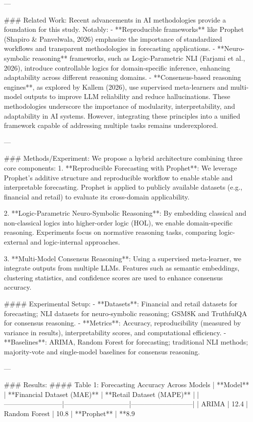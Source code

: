 ---

### Related Work:
Recent advancements in AI methodologies provide a foundation for this study. Notably:
- **Reproducible frameworks** like Prophet (Shapiro & Panvelwala, 2026) emphasize the importance of standardized workflows and transparent methodologies in forecasting applications.
- **Neuro-symbolic reasoning** frameworks, such as Logic-Parametric NLI (Farjami et al., 2026), introduce controllable logics for domain-specific inference, enhancing adaptability across different reasoning domains.
- **Consensus-based reasoning engines**, as explored by Kallem (2026), use supervised meta-learners and multi-model outputs to improve LLM reliability and reduce hallucinations.
These methodologies underscore the importance of modularity, interpretability, and adaptability in AI systems. However, integrating these principles into a unified framework capable of addressing multiple tasks remains underexplored.

---

### Methods/Experiment:
We propose a hybrid architecture combining three core components:
1. **Reproducible Forecasting with Prophet**:
   We leverage Prophet's additive structure and reproducible workflow to enable stable and interpretable forecasting. Prophet is applied to publicly available datasets (e.g., financial and retail) to evaluate its cross-domain applicability.

2. **Logic-Parametric Neuro-Symbolic Reasoning**:
   By embedding classical and non-classical logics into higher-order logic (HOL), we enable domain-specific reasoning. Experiments focus on normative reasoning tasks, comparing logic-external and logic-internal approaches.

3. **Multi-Model Consensus Reasoning**:
   Using a supervised meta-learner, we integrate outputs from multiple LLMs. Features such as semantic embeddings, clustering statistics, and confidence scores are used to enhance consensus accuracy.

#### Experimental Setup:
- **Datasets**: Financial and retail datasets for forecasting; NLI datasets for neuro-symbolic reasoning; GSM8K and TruthfulQA for consensus reasoning.
- **Metrics**: Accuracy, reproducibility (measured by variance in results), interpretability scores, and computational efficiency.
- **Baselines**: ARIMA, Random Forest for forecasting; traditional NLI methods; majority-vote and single-model baselines for consensus reasoning.

---

### Results:
#### Table 1: Forecasting Accuracy Across Models
| **Model**               | **Financial Dataset (MAE)** | **Retail Dataset (MAPE)** |
|--------------------------|-----------------------------|---------------------------|
| ARIMA                   | 12.4%
| Random Forest           | 10.8%
| **Prophet**             | **8.9%

